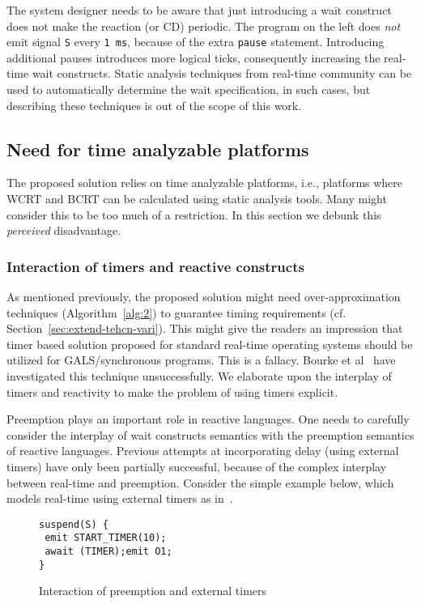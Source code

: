 The system designer needs to be aware that just introducing a wait
construct does not make the reaction (or CD) periodic. The program on
the left does \textit{not} emit signal \texttt{S} every \texttt{1 ms},
because of the extra \texttt{pause} statement. Introducing additional
pauses introduces more logical ticks, consequently increasing the
real-time wait constructs. Static analysis techniques from real-time
community can be used to automatically determine the wait specification,
in such cases, but describing these techniques is out of the scope of
this work.

\subsection{Need for time analyzable platforms}
\label{sec:need-time-analyzable}

The proposed solution relies on time analyzable platforms, i.e.,
platforms where WCRT and BCRT can be calculated using static analysis
tools. Many might consider this to be too much of a restriction. In this
section we debunk this \textit{perceived} disadvantage.

\subsubsection{Interaction of timers and reactive constructs}
\label{sec:inter-timers-react}

As mentioned previously, the proposed solution might need
over-approximation techniques (Algorithm~\ref{alg:2}) to guarantee
timing requirements (cf. Section~\ref{sec:extend-tehcn-vari}). This
might give the readers an impression that timer based solution proposed
for standard real-time operating systems should be utilized for
GALS/synchronous programs. This is a fallacy. Bourke et
al~\cite{Bourke2009a} have investigated this technique
unsuccessfully. We elaborate upon the interplay of timers and reactivity
to make the problem of using timers explicit.

Preemption plays an important role in reactive languages. One needs to
carefully consider the interplay of wait constructs semantics with the
preemption semantics of reactive languages. Previous attempts at
incorporating delay (using external timers) have only been partially
successful, because of the complex interplay between real-time and
preemption. Consider the simple example below, which models real-time
using external timers as in~\cite{rsh94}.

\begin{figure}[h!]
  \centering
	\vspace{-10pt}
		\begin{lstlisting}[style=sysj,basicstyle=\normalsize\ttfamily,morekeywords={emit,trap,pause,exit,delay,suspend}]
suspend(S) {
 emit START_TIMER(10); 
 await (TIMER);emit O1;
}
		\end{lstlisting}
  \caption{Interaction of preemption and external timers}
  \label{fig:preemp}
	\vspace{-10pt}
\end{figure}

